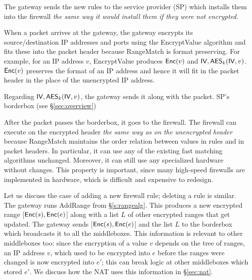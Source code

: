 




The gateway sends the new rules to the service provider (SP) which installs them into the firewall {\em the same way it would install 
them if they were not encrypted}. 

When a packet arrives at the gateway, the gateway encrypts its source/destination IP addresses and ports using the EncryptValue algorithm
and fits these into the packet header because RangeMatch is format preserving.
For example, for an IP address $v$, EncryptValue produces $\mathsf{Enc}(v)$ and $\mathsf{IV}, \mathsf{AES}_k(\mathsf{IV}, v)$.
 $\mathsf{Enc}(v)$ preserves the format of an IP address and hence 
it will fit in the packet header in the place of the unencrypted IP address.


 
 Regarding $\mathsf{IV}, \mathsf{AES}_k(\mathsf{IV}, v)$, the gateway sends it along with the packet. SP's borderbox (see \S\ref{sec:overview})

After the packet passes the borderbox, it goes to the firewall. The firewall can execute on the encrypted header {\em
the same way as on the unencrypted header} because RangeMatch maintains the order relation between values in rules and in 
packet headers. 
In particular, it can use any of the existing fast matching algorithms unchanged. 
Moreover, it can still use  any specialized hardware without changes. This property is important, since many high-speed firewalls are implemented in hardware, which is difficult and expensive to redesign.


Let us discuss the case of adding a new firewall rule; deleting a rule is similar.
The gateway runs AddRange from \S\ref{s:rangealg}. This produces a new encrypted range [$\mathsf{Enc}(s), \mathsf{Enc}(e)$] 
along with a list $L$ of other encrypted ranges that get updated. The gateway sends [$\mathsf{Enc}(s), \mathsf{Enc}(e)$] 
 and the list $L$ to the borderbox which broadcasts it to all the middleboxes.
This information is relevant to other middleboxes too: since the encryption of a value $v$ depends on the tree of ranges, an IP address $v$, which used to be encrypted into $e$ before the ranges were changed is now encrypted into $e'$; this can break logic at other middleboxes which stored $e'$. We discuss how the NAT uses this information in \S\ref{sec:nat}.

